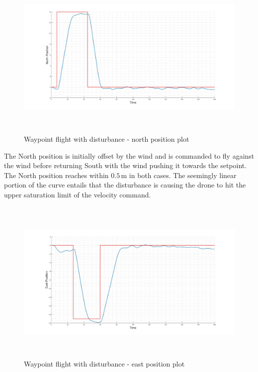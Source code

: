 		\begin{figure}[H]
			\centering
			\includegraphics[height = 8cm]{../References/Testing/SimpleWaypoint_5Wind_North.jpg}     
			\caption{Waypoint flight with disturbance - north position plot}
			\label{IM_Test11}
		\end{figure}
		
		The North position is initially offset by the wind and is commanded to fly against the wind before returning South with the wind pushing it towards the setpoint. The North position reaches within $0.5$\,m in both cases. The seemingly linear portion of the curve entails that the disturbance is causing the drone to hit the upper saturation limit of the velocity command.
		
		\begin{figure}[H]
			\centering
			\includegraphics[height = 8cm]{../References/Testing/SimpleWaypoint_5Wind_East.jpg}     
			\caption{Waypoint flight with disturbance - east position plot}
			\label{IM_Test12}
		\end{figure}
		
